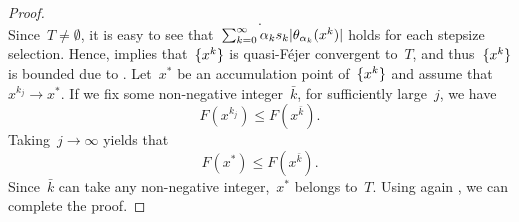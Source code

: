 \documentclass[../main]{subfiles}
\begin{document}
\begin{proof}
\begin{equation}
    .\end{equation} 
    Since~$T \neq \emptyset$, it is easy to see that~$\sum_{k = 0}^{\infty} \alpha_k s_k \lvert\theta_{\alpha_k}(x^k)\rvert$ holds for each stepsize selection.
    Hence,  implies that~$\lbrace x^k\rbrace$ is quasi-F\'ejer convergent to~$T$, and thus~$\lbrace x^k\rbrace$ is bounded due to .
    Let~$x^*$ be an accumulation point of~$\lbrace x^k\rbrace$ and assume that~$x^{k_j} \to x^*$.
    If we fix some non-negative integer~$\bar{k}$, for sufficiently large~$j$, we have
    \begin{equation}
        F(x^{k_j}) \le F(x^{\bar{k}})
    .\end{equation} 
    Taking~$j \to \infty$ yields that
    \begin{equation}
        F(x^*) \le F(x^{\bar{k}})
    .\end{equation} 
    Since~$\bar{k}$ can take any non-negative integer,~$x^*$ belongs to~$T$.
    Using again , we can complete the proof.
\end{proof}
\end{document}
